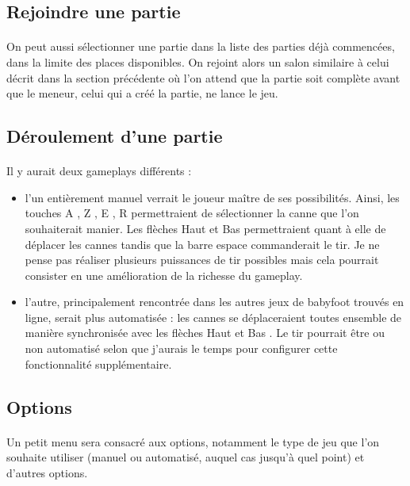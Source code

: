 \documentclass[a4paper,12pt]{report}
\begin{document}
\subsection{Rejoindre une partie}
\paragraph{}
On peut aussi sélectionner une partie dans la liste des parties déjà commencées, dans la limite des places disponibles. On rejoint alors un salon similaire à celui décrit dans la section précédente où l'on attend que la partie soit complète avant que le meneur, celui qui a créé la partie, ne lance le jeu.
\subsection{Déroulement d'une partie}
\paragraph{}
Il y aurait deux gameplays différents : 
\begin{itemize}
    \item l'un entièrement manuel verrait le joueur maître de ses possibilités. Ainsi, les touches \og A \fg, \og Z \fg, \og E \fg, \og R \fg permettraient de sélectionner la canne que l'on souhaiterait manier. Les flèches \og Haut \fg et \og Bas \fg permettraient quant à elle de déplacer les cannes tandis que la barre espace commanderait le tir. Je ne pense pas réaliser plusieurs puissances de tir possibles mais cela pourrait consister en une amélioration de la richesse du gameplay.
    \item l'autre, principalement rencontrée dans les autres jeux de babyfoot trouvés en ligne, serait plus automatisée : les cannes se déplaceraient toutes ensemble de manière synchronisée avec les flèches \og Haut \fg et \og Bas \fg. Le tir pourrait être ou non automatisé selon que j'aurais le temps pour configurer cette fonctionnalité supplémentaire.
\end{itemize}
\subsection{Options}
\paragraph{}
Un petit menu sera consacré aux options, notamment le type de jeu que l'on souhaite utiliser (manuel ou automatisé, auquel cas jusqu'à quel point) et d'autres options.
\end{document}
